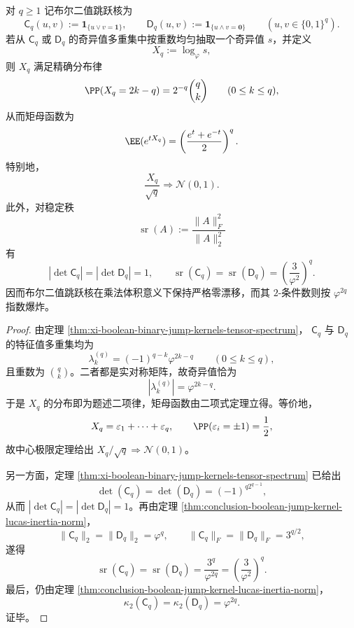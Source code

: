 \begin{theorem}\label{thm:conclusion-boolean-jump-bernoulli-gaussian-stablerank}
对 \(q\ge 1\) 记布尔二值跳跃核为
\[
\mathsf C_q(u,v):=\mathbf 1_{\{u\vee v=\mathbf 1\}},
\qquad
\mathsf D_q(u,v):=\mathbf 1_{\{u\wedge v=\mathbf 0\}}
\qquad
(u,v\in\{0,1\}^q).
\]
若从 \(\mathsf C_q\) 或 \(\mathsf D_q\) 的奇异值多重集中按重数均匀抽取一个奇异值 \(s\)，并定义
\[
X_q:=\log_{\varphi}s,
\]
则 \(X_q\) 满足精确分布律
\[
\PP(X_q=2k-q)=2^{-q}\binom{q}{k}
\qquad
(0\le k\le q),
\]
从而矩母函数为
\[
\EE(e^{tX_q})=\left(\frac{e^t+e^{-t}}{2}\right)^q.
\]
特别地，
\[
\frac{X_q}{\sqrt q}\Longrightarrow \mathcal N(0,1).
\]
此外，对稳定秩
\[
\operatorname{sr}(A):=\frac{\|A\|_F^2}{\|A\|_2^2}
\]
有
\[
|\det \mathsf C_q|=|\det \mathsf D_q|=1,
\qquad
\operatorname{sr}(\mathsf C_q)=\operatorname{sr}(\mathsf D_q)=\left(\frac{3}{\varphi^2}\right)^q.
\]
因而布尔二值跳跃核在乘法体积意义下保持严格零漂移，而其 \(2\)-条件数则按 \(\varphi^{2q}\) 指数爆炸。
\end{theorem}
\begin{proof}
由定理 \ref{thm:xi-boolean-binary-jump-kernels-tensor-spectrum}，
\(\mathsf C_q\) 与 \(\mathsf D_q\) 的特征值多重集均为
\[
\lambda_k^{(q)}=(-1)^{q-k}\varphi^{2k-q}
\qquad (0\le k\le q),
\]
且重数为 \(\binom{q}{k}\)。二者都是实对称矩阵，故奇异值恰为
\[
|\lambda_k^{(q)}|=\varphi^{2k-q}.
\]
于是 \(X_q\) 的分布即为题述二项律，矩母函数由二项式定理立得。等价地，
\[
X_q=\varepsilon_1+\cdots+\varepsilon_q,
\qquad
\PP(\varepsilon_i=\pm 1)=\frac12,
\]
故中心极限定理给出
\(
X_q/\sqrt q\Longrightarrow \mathcal N(0,1)
\)。

另一方面，定理 \ref{thm:xi-boolean-binary-jump-kernels-tensor-spectrum} 已给出
\[
\det(\mathsf C_q)=\det(\mathsf D_q)=(-1)^{q2^{q-1}},
\]
从而 \( |\det \mathsf C_q|=|\det \mathsf D_q|=1\)。再由定理 \ref{thm:conclusion-boolean-jump-kernel-lucas-inertia-norm}，
\[
\|\mathsf C_q\|_2=\|\mathsf D_q\|_2=\varphi^q,
\qquad
\|\mathsf C_q\|_F=\|\mathsf D_q\|_F=3^{q/2},
\]
遂得
\[
\operatorname{sr}(\mathsf C_q)=\operatorname{sr}(\mathsf D_q)
=\frac{3^q}{\varphi^{2q}}
=\left(\frac{3}{\varphi^2}\right)^q.
\]
最后，仍由定理 \ref{thm:conclusion-boolean-jump-kernel-lucas-inertia-norm}，
\[
\kappa_2(\mathsf C_q)=\kappa_2(\mathsf D_q)=\varphi^{2q}.
\]
证毕。
\end{proof}

